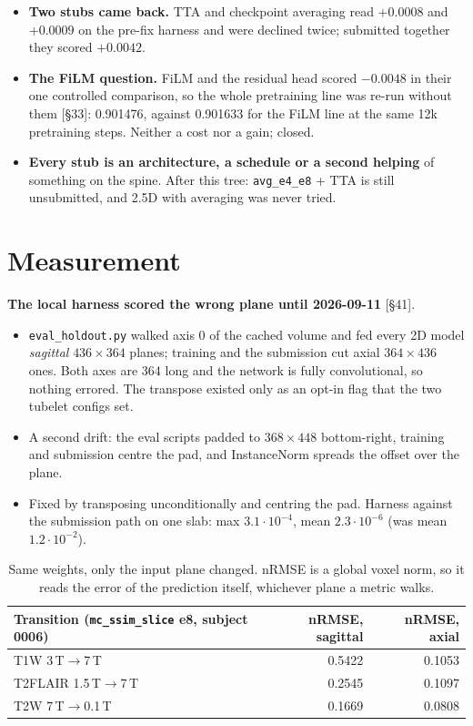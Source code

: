 \documentclass[10pt,a4paper]{article}
\begin{document}
\begin{itemize}
  \item \textbf{Two stubs came back.} TTA and checkpoint averaging read $+0.0008$ and $+0.0009$ on
        the pre-fix harness and were declined twice; submitted together they scored $+0.0042$.
  \item \textbf{The FiLM question.} FiLM and the residual head scored $-0.0048$ in their one
        controlled comparison, so the whole pretraining line was re-run without them [\S33]:
        0.901476, against 0.901633 for the FiLM line at the same 12k pretraining steps.
        Neither a cost nor a gain; closed.
  \item \textbf{Every stub is an architecture, a schedule or a second helping} of something on
        the spine. After this tree: \texttt{avg\_e4\_e8} + TTA is still unsubmitted, and 2.5D
        with averaging was never tried.
\end{itemize}

\section{Measurement}\label{sec:measure}

\textbf{The local harness scored the wrong plane until 2026-09-11} [\S41].
\begin{itemize}
  \item \texttt{eval\_holdout.py} walked axis 0 of the cached volume and fed every 2D model
        \emph{sagittal} $436\times364$ planes; training and the submission cut axial
        $364\times436$ ones. Both axes are 364 long and the network is fully convolutional, so
        nothing errored. The transpose existed only as an opt-in flag that the two tubelet
        configs set.
  \item A second drift: the eval scripts padded to $368\times448$ bottom-right, training and
        submission centre the pad, and InstanceNorm spreads the offset over the plane.
  \item Fixed by transposing unconditionally and centring the pad. Harness against the submission
        path on one slab: max $3.1\cdot10^{-4}$, mean $2.3\cdot10^{-6}$ (was mean
        $1.2\cdot10^{-2}$).
\end{itemize}

\begin{table}[H]
\centering\small
\begin{tabular}{lrr}
\toprule
Transition (\texttt{mc\_ssim\_slice} e8, subject 0006) & nRMSE, sagittal & nRMSE, axial \\
\midrule
T1W 3\,T$\to$7\,T        & 0.5422 & 0.1053 \\
T2FLAIR 1.5\,T$\to$7\,T  & 0.2545 & 0.1097 \\
T2W 7\,T$\to$0.1\,T      & 0.1669 & 0.0808 \\
\bottomrule
\end{tabular}
\caption{Same weights, only the input plane changed. nRMSE is a global voxel norm, so it reads
the error of the prediction itself, whichever plane a metric walks.}
\label{tab:plane}
\end{table}
\end{document}
